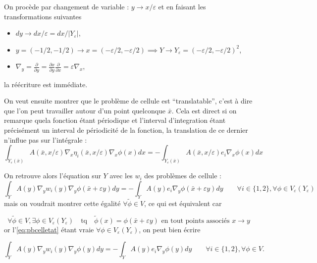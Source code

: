 \documentclass[11pt]{article}
\newcommand{\bx}{\bar{x}}
\newcommand{\tphi}{\tilde{\phi}}
\newcommand{\Ye}{Y_\varepsilon}
\begin{document}
On procède par changement de variable : $ y \rightarrow x/\varepsilon $ et en faisant les transformations suivantes
\begin{itemize}
\item $dy \rightarrow dx/\varepsilon = dx/|\Ye|$,
\item $y=(-1/2, -1/2) \rightarrow x=(-\varepsilon/2, -\varepsilon/2) \implies Y \rightarrow \Ye = (-\varepsilon/2, -\varepsilon/2)^2$,
\item $\nabla_y = \frac{\partial}{\partial y} = \frac{\partial x}{\partial y}\frac{\partial}{\partial x} = \varepsilon \nabla_x $,
\end{itemize}
la réécriture est immédiate.

On veut ensuite montrer que le problème de cellule est ``translatable'', c'est à dire que l'on peut travailler autour d'un point quelconque
$\bx$. Cela est direct si on remarque quela fonction étant périodique et l'interval d'integration étant précisément un interval de périodicité de la
fonction, la translation de ce dernier n'influe pas sur l'intégrale :
\begin{equation}
  \label{eq:pbcelletat}
  \int_{\Ye(\bx)} A(\bx, x/\varepsilon)\nabla_x \eta_i(\bx, x/\varepsilon) \nabla_x \phi(x) dx =
  - \int_{\Ye(\bx)} A(\bx, x/\varepsilon) e_i \nabla_x \phi(x) dx
\end{equation}

On retrouve alors l'équation sur $Y$ avec les $w_i$ des problèmes de cellule :
\[
    \int_{Y} A(y)\nabla_y w_i(y) \nabla_y \phi(\bx+\varepsilon y) dy =
  - \int_{Y} A(y) e_i \nabla_y \phi(\bx+\varepsilon y) dy \qquad \forall i \in \{1, 2\}, \forall \phi\in V_\varepsilon(\Ye)
\]
mais on voudrait montrer cette égalité $\forall \tphi \in V$, ce qui est équivalent car

\[
  \forall \tphi \in V, \exists \phi \in V_\varepsilon(\Ye) \quad \text{tq} \quad \tphi(x) =
  \phi(\bx+\varepsilon y) \text{ en tout points associés } x \rightarrow y
\]
or l'\autoref{eq:pbcelletat} étant vraie $\forall \phi \in V_\varepsilon(\Ye)$, on peut bien écrire 

\begin{equation}
  \int_{Y} A(y)\nabla_y w_i(y) \nabla_y \phi(y) dy =
  - \int_{Y} A(y) e_i \nabla_y \phi(y) dy \qquad \forall i \in \{1, 2\}, \forall \phi\in V.
\end{equation}
\end{document}
